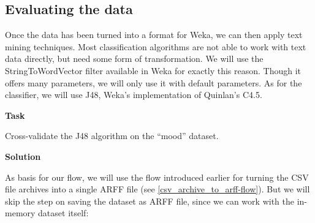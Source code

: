 \documentclass[a4paper,10pt]{book}
\newcommand{\heading}[1]{
  \vspace{0.3cm} \noindent \textbf{#1} \newline
}
\begin{document}
\subsection{Evaluating the data}
Once the data has been turned into a format for Weka, we can then apply text mining techniques. Most classification algorithms are not able to work with text data directly, but need some form of transformation. We will use the StringToWordVector filter available in Weka for exactly this reason. Though it offers many parameters, we will only use it with default parameters. As for the classifier, we will use J48, Weka's implementation of Quinlan's C4.5\cite{c45}.

\heading{Task}
Cross-validate the J48 algorithm on the ``mood'' dataset.

\heading{Solution}
As basis for our flow, we will use the flow introduced earlier for turning the CSV file archives into a single ARFF file (see \ref{csv_archive_to_arff-flow}). But we will skip the step on saving the dataset as ARFF file, since we can work with the in-memory dataset itself:
\end{document}
